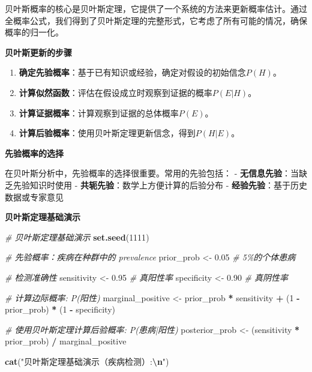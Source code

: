 \documentclass[
  twoside]{book}
\newenvironment{Shaded}{\begin{snugshade}}{\end{snugshade}}
\newcommand{\CommentTok}[1]{\textcolor[rgb]{0.56,0.35,0.01}{\textit{#1}}}
\newcommand{\DecValTok}[1]{\textcolor[rgb]{0.00,0.00,0.81}{#1}}
\newcommand{\FloatTok}[1]{\textcolor[rgb]{0.00,0.00,0.81}{#1}}
\newcommand{\FunctionTok}[1]{\textcolor[rgb]{0.13,0.29,0.53}{\textbf{#1}}}
\newcommand{\NormalTok}[1]{#1}
\newcommand{\OtherTok}[1]{\textcolor[rgb]{0.56,0.35,0.01}{#1}}
\newcommand{\SpecialCharTok}[1]{\textcolor[rgb]{0.81,0.36,0.00}{\textbf{#1}}}
\newcommand{\StringTok}[1]{\textcolor[rgb]{0.31,0.60,0.02}{#1}}
\begin{document}
贝叶斯概率的核心是贝叶斯定理，它提供了一个系统的方法来更新概率估计。通过全概率公式，我们得到了贝叶斯定理的完整形式，它考虑了所有可能的情况，确保概率的归一化。

\textbf{贝叶斯更新的步骤}

\begin{enumerate}
\def\labelenumi{\arabic{enumi}.}
\item
  \textbf{确定先验概率}：基于已有知识或经验，确定对假设的初始信念\(P(H)\)。
\item
  \textbf{计算似然函数}：评估在假设成立时观察到证据的概率\(P(E|H)\)。
\item
  \textbf{计算证据概率}：计算观察到证据的总体概率\(P(E)\)。
\item
  \textbf{计算后验概率}：使用贝叶斯定理更新信念，得到\(P(H|E)\)。
\end{enumerate}

\textbf{先验概率的选择}

在贝叶斯分析中，先验概率的选择很重要。常用的先验包括：
- \textbf{无信息先验}：当缺乏先验知识时使用
- \textbf{共轭先验}：数学上方便计算的后验分布
- \textbf{经验先验}：基于历史数据或专家意见

\textbf{贝叶斯定理基础演示}

\begin{Shaded}
\begin{Highlighting}[]
\CommentTok{\# 贝叶斯定理基础演示}
\FunctionTok{set.seed}\NormalTok{(}\DecValTok{1111}\NormalTok{)}

\CommentTok{\# 先验概率：疾病在种群中的 prevalence}
\NormalTok{prior\_prob }\OtherTok{\textless{}{-}} \FloatTok{0.05}  \CommentTok{\# 5\%的个体患病}

\CommentTok{\# 检测准确性}
\NormalTok{sensitivity }\OtherTok{\textless{}{-}} \FloatTok{0.95}  \CommentTok{\# 真阳性率}
\NormalTok{specificity }\OtherTok{\textless{}{-}} \FloatTok{0.90}  \CommentTok{\# 真阴性率}

\CommentTok{\# 计算边际概率: P(阳性)}
\NormalTok{marginal\_positive }\OtherTok{\textless{}{-}}\NormalTok{ prior\_prob }\SpecialCharTok{*}\NormalTok{ sensitivity }\SpecialCharTok{+}\NormalTok{ (}\DecValTok{1} \SpecialCharTok{{-}}\NormalTok{ prior\_prob) }\SpecialCharTok{*}\NormalTok{ (}\DecValTok{1} \SpecialCharTok{{-}}\NormalTok{ specificity)}

\CommentTok{\# 使用贝叶斯定理计算后验概率: P(患病|阳性)}
\NormalTok{posterior\_prob }\OtherTok{\textless{}{-}}\NormalTok{ (sensitivity }\SpecialCharTok{*}\NormalTok{ prior\_prob) }\SpecialCharTok{/}\NormalTok{ marginal\_positive}

\FunctionTok{cat}\NormalTok{(}\StringTok{"贝叶斯定理基础演示（疾病检测）:}\SpecialCharTok{\textbackslash{}n}\StringTok{"}\NormalTok{)}
\end{Highlighting}
\end{Shaded}
\end{document}
